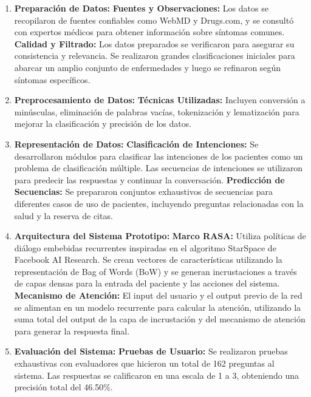 	\begin{enumerate}
		
		\item \textbf{Preparación de Datos:}
			\subitem \textbf{Fuentes y Observaciones:} Los datos se recopilaron de fuentes confiables como WebMD y Drugs.com, y se consultó con expertos médicos para obtener información sobre síntomas comunes.
			\subitem \textbf{Calidad y Filtrado:} Los datos preparados se verificaron para asegurar su consistencia y relevancia. Se realizaron grandes clasificaciones iniciales para abarcar un amplio conjunto de enfermedades y luego se refinaron según síntomas específicos.
		\item \textbf{Preprocesamiento de Datos:}
			\subitem \textbf{Técnicas Utilizadas:} Incluyen conversión a minúsculas, eliminación de palabras vacías, tokenización y lematización para mejorar la clasificación y precisión de los datos.
		\item \textbf{Representación de Datos:}
			\subitem \textbf{Clasificación de Intenciones:} Se desarrollaron módulos para clasificar las intenciones de los pacientes como un problema de clasificación múltiple. Las secuencias de intenciones se utilizaron para predecir las respuestas y continuar la conversación.
			\subitem \textbf{Predicción de Secuencias:} Se prepararon conjuntos exhaustivos de secuencias para diferentes casos de uso de pacientes, incluyendo preguntas relacionadas con la salud y la reserva de citas.
		\item \textbf{Arquitectura del Sistema Prototipo:}
			\subitem \textbf{Marco RASA:} Utiliza políticas de diálogo embebidas recurrentes inspiradas en el algoritmo StarSpace de Facebook AI Research. Se crean vectores de características utilizando la representación de Bag of Words (BoW) y se generan incrustaciones a través de capas densas para la entrada del paciente y las acciones del sistema.
			\subitem \textbf{Mecanismo de Atención:} El input del usuario y el output previo de la red se alimentan en un modelo recurrente para calcular la atención, utilizando la suma total del output de la capa de incrustación y del mecanismo de atención para generar la respuesta final.
		\item \textbf{Evaluación del Sistema:}
			\subitem \textbf{Pruebas de Usuario:} Se realizaron pruebas exhaustivas con evaluadores que hicieron un total de 162 preguntas al sistema. Las respuestas se calificaron en una escala de 1 a 3, obteniendo una precisión total del 46.50\%.
	\end{enumerate}


